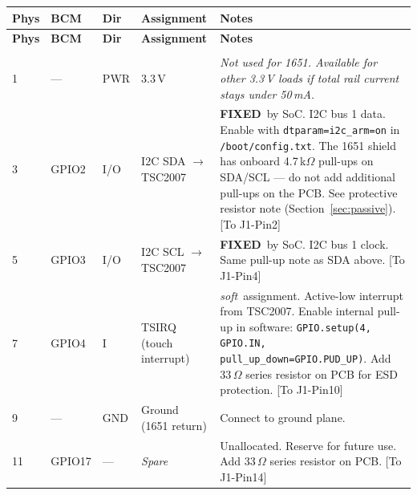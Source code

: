 \documentclass[11pt,a4paper]{article}
\newcommand{\fixed}{\textbf{FIXED}}
\newcommand{\soft}{\textit{soft}}
\newcommand{\na}{---}
\begin{document}
\begin{longtable}{C{0.9cm} C{1.3cm} C{0.8cm} L{3.5cm} L{7.5cm}}
  \toprule
  \color{white}\textbf{Phys} &
  \color{white}\textbf{BCM} &
  \color{white}\textbf{Dir} &
  \color{white}\textbf{Assignment} &
  \color{white}\textbf{Notes} \\
  \midrule
  \endfirsthead
  \toprule
  \color{white}\textbf{Phys} &
  \color{white}\textbf{BCM} &
  \color{white}\textbf{Dir} &
  \color{white}\textbf{Assignment} &
  \color{white}\textbf{Notes} \\
  \midrule
  \endhead
  \bottomrule
  \endfoot

   \\
  \midrule

  1 & \na & PWR & 3.3\,V & \textit{Not used for 1651. Available for other 3.3\,V loads
    if total rail current stays under 50\,mA.} \\

  3 & GPIO2 & I/O & I2C SDA $\to$ TSC2007 &
    \fixed\ by SoC. I2C bus 1 data.
    Enable with \texttt{dtparam=i2c\_arm=on} in \texttt{/boot/config.txt}.
    The 1651 shield has onboard 4.7\,k$\Omega$ pull-ups on SDA/SCL --- do not add
    additional pull-ups on the PCB. See protective resistor note (Section~\ref{sec:passive}). 
    [To J1-Pin2]\\

  5 & GPIO3 & I/O & I2C SCL $\to$ TSC2007 &
    \fixed\ by SoC. I2C bus 1 clock.
    Same pull-up note as SDA above. 
    [To J1-Pin4]\\

  7 & GPIO4 & I & TSIRQ (touch interrupt) &
    \soft\ assignment.
    Active-low interrupt from TSC2007.
    Enable internal pull-up in software: \texttt{GPIO.setup(4, GPIO.IN, pull\_up\_down=GPIO.PUD\_UP)}.
    Add 33\,$\Omega$ series resistor on PCB for ESD protection. 
    [To J1-Pin10]\\

  9 & \na & GND & Ground (1651 return) &
    Connect to ground plane. \\

  11 & GPIO17 & \na & \textit{Spare} &
  Unallocated. Reserve for future use. 
  Add 33\,$\Omega$ series resistor on PCB. 
  [To J1-Pin14]\\


\end{longtable}
\end{document}
